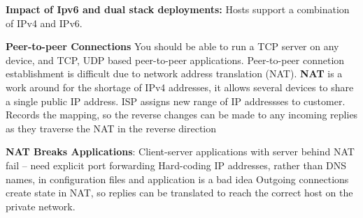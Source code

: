 \documentclass{article}
\begin{document}
\noindent \textbf{Impact of Ipv6 and dual stack deployments:}
Hosts support a combination of IPv4 and IPv6.

\noindent \textbf{Peer-to-peer Connections}
You should be able to run a TCP server on any device, and TCP, UDP based peer-to-peer applications.
Peer-to-peer connetion establishment is difficult due to network address translation (NAT).
\noindent \textbf{NAT} is a work around for the shortage of IPv4 addresses, it allows several devices to share a single public IP address.
ISP assigns new range of IP addressses to customer.
Records the mapping, so the reverse changes can be made to any incoming replies as they traverse the NAT in the reverse direction

\noindent \textbf{NAT Breaks Applications}:
Client-server applications with server behind NAT fail – need explicit port forwarding
Hard-coding IP addresses, rather than DNS names, in configuration files and application is a bad idea
Outgoing connections create state in NAT, so replies can be translated to reach the correct host on the private network.
\end{document}
